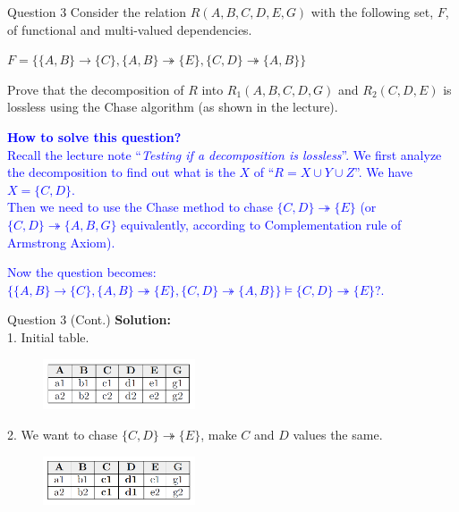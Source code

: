 \begin{frame}[fragile]{Question 3}
Consider the relation $R(A,B,C,D,E,G)$ with the following set, $F$, of functional and multi-valued dependencies.\\ \vspace{5pt}
	
$F=\{\{A,B\}\rightarrow\{C\}, \{A,B\}\twoheadrightarrow\{E\},\{C,D\}\twoheadrightarrow\{A,B\}\}$\\ \vspace{5pt}
	
Prove that the decomposition of $R$ into $R_1(A,B,C,D,G)$ and $R_2(C,D,E)$ is lossless using the Chase algorithm (as shown in the lecture).\\ \vspace{5pt}

\textbf{\textcolor{blue}{How to solve this question?}}\\\vspace{5pt}
\textcolor{blue}{Recall the lecture note ``\emph{Testing if a decomposition is lossless}''.
We first analyze the decomposition to find out what is the $X$ of ``$R=X\cup Y\cup Z$''. We have $X=\{C,D\}$.\\\vspace{2pt}
Then we need to use the Chase method to chase $\{C,D\}\twoheadrightarrow\{E\}$ ({\small or $\{C,D\}\twoheadrightarrow\{A,B,G\}$ equivalently, according to Complementation rule of Armstrong Axiom}).}\\\vspace{5pt}

\textcolor{blue}{Now the question becomes:\\
$\{\{A,B\}\rightarrow\{C\}, \{A,B\}\twoheadrightarrow\{E\},\{C,D\}\twoheadrightarrow\{A,B\}\} \models \{C,D\}\twoheadrightarrow\{E\}$?.}
\end{frame}

\begin{frame}[fragile]{Question 3 (Cont.)}	
\textbf{Solution:}\\ \vspace{2pt}
1. Initial table.\\
\begin{figure}
	\includegraphics[width=0.4\textwidth, trim=0 0 0 0, clip]{4221-t5/images/3-1.png}
\end{figure}

2. We want to chase $\{C,D\} \twoheadrightarrow \{E\}$, make $C$ and $D$ values the same.\\
\begin{figure}
	\includegraphics[width=0.4\textwidth, trim=0 0 0 0, clip]{4221-t5/images/3-2.png}
\end{figure}

\end{frame}


